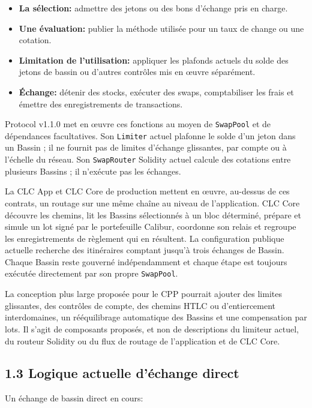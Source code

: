 \documentclass[11pt]{article}
\begin{document}
\begin{itemize}[leftmargin=*]
\item \textbf{La sélection:} admettre des jetons ou des bons d'échange pris en charge.
\item \textbf{Une évaluation:} publier la méthode utilisée pour un taux de change ou une cotation.
\item \textbf{Limitation de l'utilisation:} appliquer les plafonds actuels du solde des jetons de bassin ou d'autres contrôles mis en œuvre séparément.
\item \textbf{Échange:} détenir des stocks, exécuter des swaps, comptabiliser les frais et émettre des enregistrements de transactions.
\end{itemize}
Protocol v1.1.0 met en œuvre ces fonctions au moyen de \texttt{SwapPool} et de dépendances facultatives. Son \texttt{Limiter} actuel plafonne le solde d'un jeton dans un Bassin ; il ne fournit pas de limites d'échange glissantes, par compte ou à l'échelle du réseau. Son \texttt{SwapRouter} Solidity actuel calcule des cotations entre plusieurs Bassins ; il n'exécute pas les échanges.

La CLC App et CLC Core de production mettent en œuvre, au-dessus de ces contrats, un routage sur une même chaîne au niveau de l'application. CLC Core découvre les chemins, lit les Bassins sélectionnés à un bloc déterminé, prépare et simule un lot signé par le portefeuille Calibur, coordonne son relais et regroupe les enregistrements de règlement qui en résultent. La configuration publique actuelle recherche des itinéraires comptant jusqu'à trois échanges de Bassin. Chaque Bassin reste gouverné indépendamment et chaque étape est toujours exécutée directement par son propre \texttt{SwapPool}.

La conception plus large proposée pour le CPP pourrait ajouter des limites glissantes, des contrôles de compte, des chemins HTLC ou d'entiercement interdomaines, un rééquilibrage automatique des Bassins et une compensation par lots. Il s'agit de composants proposés, et non de descriptions du limiteur actuel, du routeur Solidity ou du flux de routage de l'application et de CLC Core.

\subsection*{1.3 Logique actuelle d'échange direct}

Un échange de bassin direct en cours:
\end{document}
